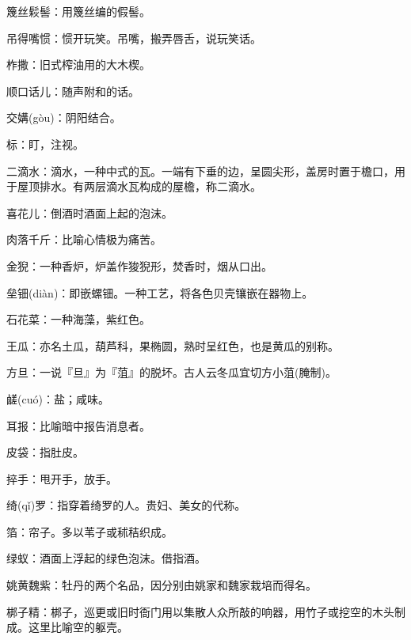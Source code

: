 \startbuffer[2160]
篾丝鬏髻：用篾丝编的假髻。
\stopbuffer


\startbuffer[2161]
吊得嘴惯：惯开玩笑。吊嘴，搬弄唇舌，说玩笑话。
\stopbuffer


\startbuffer[2162]
柞撒：旧式榨油用的大木楔。
\stopbuffer


\startbuffer[2163]
顺口话儿：随声附和的话。
\stopbuffer


\startbuffer[2164]
交媾(gòu)：阴阳结合。
\stopbuffer


\startbuffer[2165]
标：盯，注视。
\stopbuffer


\startbuffer[2166]
二滴水：滴水，一种中式的瓦。一端有下垂的边，呈圆尖形，盖房时置于檐口，用于屋顶排水。有两层滴水瓦构成的屋檐，称二滴水。
\stopbuffer


\startbuffer[2167]
喜花儿：倒酒时酒面上起的泡沫。
\stopbuffer


\startbuffer[2168]
肉落千斤：比喻心情极为痛苦。
\stopbuffer


\startbuffer[2169]
金猊：一种香炉，炉盖作狻猊形，焚香时，烟从口出。
\stopbuffer


\startbuffer[2170]
垒钿(diàn)：即嵌螺钿。一种工艺，将各色贝壳镶嵌在器物上。
\stopbuffer


\startbuffer[2171]
石花菜：一种海藻，紫红色。
\stopbuffer


\startbuffer[2172]
王瓜：亦名土瓜，葫芦科，果椭圆，熟时呈红色，也是黄瓜的别称。
\stopbuffer


\startbuffer[2173]
方旦：一说『旦』为『菹』的脱坏。古人云冬瓜宜切方小菹(腌制)。
\stopbuffer


\startbuffer[2174]
鹾(cuó)：盐；咸味。
\stopbuffer


\startbuffer[2175]
耳报：比喻暗中报告消息者。
\stopbuffer


\startbuffer[2176]
皮袋：指肚皮。
\stopbuffer


\startbuffer[2177]
捽手：甩开手，放手。
\stopbuffer


\startbuffer[2178]
绮(qǐ)罗：指穿着绮罗的人。贵妇、美女的代称。
\stopbuffer


\startbuffer[2179]
箔：帘子。多以苇子或秫秸织成。
\stopbuffer


\startbuffer[2180]
绿蚁：酒面上浮起的绿色泡沫。借指酒。
\stopbuffer


\startbuffer[2181]
姚黄魏紫：牡丹的两个名品，因分别由姚家和魏家栽培而得名。
\stopbuffer


\startbuffer[2182]
梆子精：梆子，巡更或旧时衙门用以集散人众所敲的响器，用竹子或挖空的木头制成。这里比喻空的躯壳。
\stopbuffer


